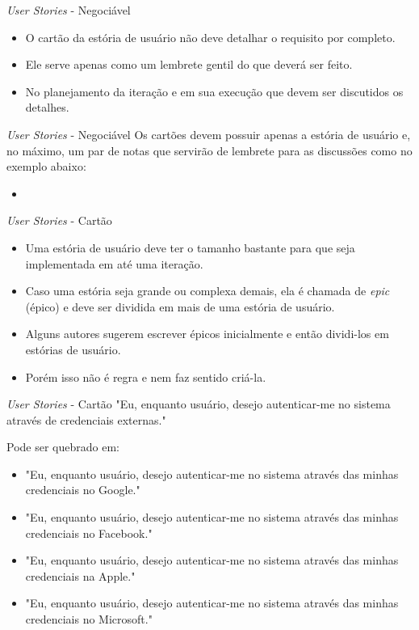 \documentclass[11pt]{beamer}
\begin{document}
   \begin{frame}{\textit{User Stories} - Negociável}
      \begin{itemize}
         \item O cartão da estória de usuário não deve detalhar o requisito por completo.
         \item Ele serve apenas como um lembrete gentil do que deverá ser feito.
         \item No planejamento da iteração e em sua execução que devem ser discutidos os detalhes.
      \end{itemize}
   \end{frame}

   \begin{frame}{\textit{User Stories} - Negociável}
      Os cartões devem possuir apenas a estória de usuário e, no máximo, um par de notas que servirão de lembrete para as discussões como no exemplo abaixo:
      \begin{itemize}
         \item 
      \end{itemize}
   \end{frame}

   \begin{frame}{\textit{User Stories} - Cartão}
      \begin{itemize}
         \item Uma estória de usuário deve ter o tamanho bastante para que seja implementada em até uma iteração.
         \item Caso uma estória seja grande ou complexa demais, ela é chamada de \textit{epic} (épico) e deve ser dividida em mais de uma estória de usuário.
         \item Alguns autores sugerem escrever épicos inicialmente e então dividi-los em estórias de usuário.
         \item Porém isso não é regra e nem faz sentido criá-la.
      \end{itemize}
   \end{frame}

   \begin{frame}{\textit{User Stories} - Cartão}
       "Eu, enquanto usuário, desejo autenticar-me no sistema através de credenciais externas."
\vspace{1cm}       

       Pode ser quebrado em:
      \begin{itemize}
         \item "Eu, enquanto usuário, desejo autenticar-me no sistema através das minhas credenciais no Google."
         \item "Eu, enquanto usuário, desejo autenticar-me no sistema através das minhas credenciais no Facebook."
         \item "Eu, enquanto usuário, desejo autenticar-me no sistema através das minhas credenciais na Apple."
         \item "Eu, enquanto usuário, desejo autenticar-me no sistema através das minhas credenciais no Microsoft."
      \end{itemize}
   \end{frame}
\end{document}
